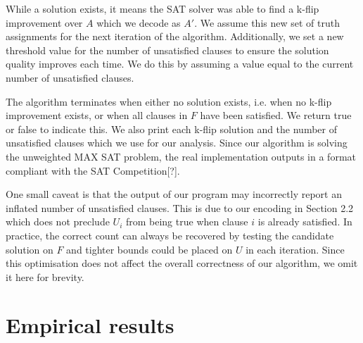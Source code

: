 \documentclass{article}
\begin{document}
\noindent While a solution exists, it means the SAT solver was able to find a
k-flip improvement over $A$ which we decode as $A'$. We assume this new set of
truth assignments for the next iteration of the algorithm. Additionally, we set
a new threshold value for the number of unsatisfied clauses to ensure the
solution quality improves each time. We do this by assuming a value equal to
the current number of unsatisfied clauses.

The algorithm terminates when either no solution exists, i.e. when no k-flip
improvement exists, or when all clauses in $F$ have been satisfied. We return
true or false to indicate this. We also print each k-flip solution and the
number of unsatisfied clauses which we use for our analysis. Since our algorithm
is solving the unweighted MAX SAT problem, the real implementation outputs in a
format compliant with the SAT Competition[?].

One small caveat is that the output of our program may incorrectly report an
inflated number of unsatisfied clauses. This is due to our encoding in Section
2.2 which does not preclude $U_i$ from being true when clause $i$ is already
satisfied. In practice, the correct count can always be recovered by testing
the candidate solution on $F$ and tighter bounds could be placed on $U$ in each
iteration. Since this optimisation does not affect the overall correctness of
our algorithm, we omit it here for brevity.

\break

\section{Empirical results}

\end{document}
